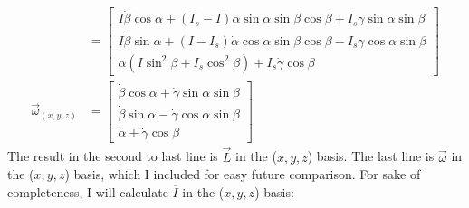 \documentclass[10pt]{article}
\begin{document}
\begin{align}
    &=
    \begin{bmatrix}
        I\dot\beta\cos\alpha+(I_s-I)\dot\alpha\sin\alpha\sin\beta\cos\beta 
            +I_s\dot\gamma\sin\alpha\sin\beta \\
        I\dot\beta\sin\alpha+(I-I_s)\dot\alpha\cos\alpha\sin\beta\cos\beta
            -I_s\dot\gamma\cos\alpha\sin\beta \\
        \dot\alpha(I\sin^2\beta+I_s\cos^2\beta)+I_s\dot\gamma\cos\beta
    \end{bmatrix}
    \\
    \vec{\omega}_{(x,y,z)}&=
    \begin{bmatrix}
        \dot\beta\cos\alpha +\dot\gamma\sin\alpha\sin\beta \\
        \dot\beta\sin\alpha-\dot\gamma\cos\alpha\sin\beta \\
        \dot\alpha+\dot\gamma\cos\beta
    \end{bmatrix}
\end{align}
The result in the second to last line is $\vec{L}$ in the ($x,y,z$) basis.
The last line is $\vec{\omega}$ in the ($x,y,z$) basis, which I included 
for easy future comparison. For sake of completeness, I will calculate 
$\overline{I}$ in the ($x,y,z$) basis:
\end{document}
